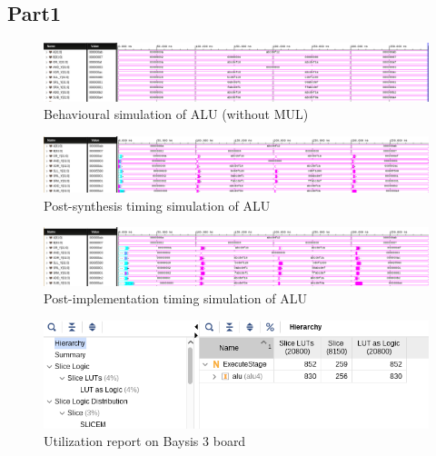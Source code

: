 \documentclass[CMPE]{../KGCOEReport}
\begin{document}
    \subsection*{Part1}
    \begin{figure}[h!]
        \centering
        \includegraphics[width=\textwidth]{img/alu_behav}
        \caption{Behavioural simulation of ALU (without MUL)}
        \label{fig:demo1}
	\end{figure}
    \begin{figure}[h!]
        \centering
        \includegraphics[width=\textwidth]{img/alu_synth}
        \caption{Post-synthesis timing simulation of ALU}
        \label{fig:demo1}
	\end{figure}
    \begin{figure}[h!]
        \centering
        \includegraphics[width=\textwidth]{img/alu_impl}
        \caption{Post-implementation timing simulation of ALU}
        \label{fig:demo1}
	\end{figure}
    \begin{figure}[h!]
        \centering
        \includegraphics[width=\textwidth]{img/util_report}
        \caption{Utilization report on Baysis 3 board}
        \label{fig:demo1}
	\end{figure}
\end{document}
